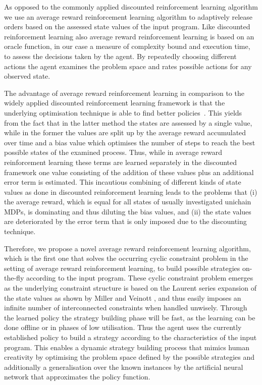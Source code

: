 \documentclass[envcountsame]{llncs}
\begin{document}
As opposed to the commonly applied discounted reinforcement learning algorithm we use an average
reward reinforcement learning algorithm to adaptively release orders based on the assessed state
values of the input program. Like discounted reinforcement learning also average reward
reinforcement learning is based on an oracle function, in our case a measure of complexity bound and
execution time, to assess the decisions taken by the agent. By repeatedly choosing different actions
the agent examines the problem space and rates possible actions for any observed state.

The advantage of average reward reinforcement learning in comparison to the widely applied
discounted reinforcement learning framework is that the underlying optimisation technique is able to
find better policies~\cite{miller1969discrete,Puterman94}. This yields from the fact that in the
latter method the states are assessed by a single value, while in the former the values are split up
by the average reward accumulated over time and a bias value which optimises the number of steps to
reach the best possible states of the examined process. Thus, while in average reward reinforcement
learning these terms are learned separately in the discounted framework one value consisting of the
addition of these values plus an additional error term is estimated. This incautious combining of
different kinds of state values as done in discounted reinforcement learning leads to the problems
that (i) the average reward, which is equal for all states of usually investigated unichain MDPs, is
dominating and thus diluting the bias values, and (ii) the state values are deteriorated by the
error term that is only imposed due to the discounting technique.


Therefore, we propose a novel average reward reinforcement learning algorithm, which is the first
one that solves the occurring cyclic constraint problem in the setting of average reward
reinforcement learning, to build possible strategies on-the-fly according to the input program.
These cyclic constraint problem emerges as the underlying constraint structure is based on the
Laurent series expansion of the state values as shown by Miller and Veinott
\cite{miller1969discrete}, and thus easily imposes an infinite number of interconnected constraints
when handled unwisely. Through the learned policy the strategy building phase will be fast, as the
learning can be done offline or in phases of low utilisation. Thus the agent uses the currently
established policy to build a strategy according to the characteristics of the input program. This
enables a dynamic strategy building process that mimics human creativity by optimising the problem
space defined by the possible strategies and additionally a generalisation over the known instances
by the artificial neural network that approximates the policy function.
\end{document}
